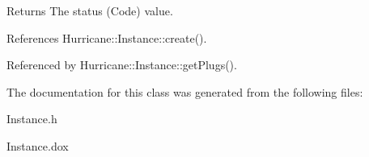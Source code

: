 \begin{DoxyReturn}{Returns}
The status (Code) value. 
\end{DoxyReturn}


References Hurricane\+::\+Instance\+::create().



Referenced by Hurricane\+::\+Instance\+::get\+Plugs().



The documentation for this class was generated from the following files\+:\begin{DoxyCompactItemize}
\item 
Instance.\+h\item 
Instance.\+dox\end{DoxyCompactItemize}

